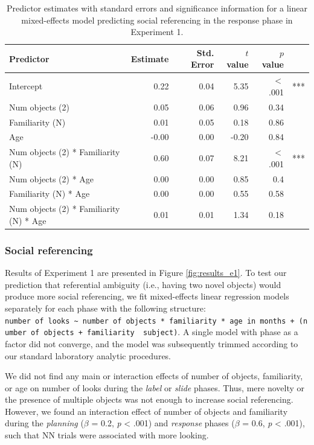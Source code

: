\documentclass[a4paper,man,apacite,floatsintext]{apa6}
\begin{document}
\begin{table}[tb]
\centering
\begin{tabular}{lrrrrl}
 Predictor & Estimate & Std. Error & $t$ value & $p$ value &  \\ 
  \hline
Intercept & 0.22 & 0.04 & 5.35 & $<$ .001 & *** \\ 
  Num objects (2) & 0.05 & 0.06 & 0.96 & 0.34 &  \\ 
  Familiarity (N) & 0.01 & 0.05 & 0.18 & 0.86 &  \\ 
  Age & -0.00 & 0.00 & -0.20 & 0.84 &  \\ 
  Num objects (2) * Familiarity (N) & 0.60 & 0.07 & 8.21 & $<$ .001 & *** \\ 
  Num objects (2) * Age & 0.00 & 0.00 & 0.85 & 0.4 &  \\ 
  Familiarity (N) * Age & 0.00 & 0.00 & 0.55 & 0.58 &  \\ 
  Num objects (2) * Familiarity (N) * Age & 0.01 & 0.01 & 1.34 & 0.18 &  \\ 
   \hline
\end{tabular}
\caption{Predictor estimates with standard errors and significance information for a linear mixed-effects model predicting social referencing in the response phase in Experiment 1.} 
\label{tab:exp1_r_reg}
\end{table}

\subsubsection{Social referencing}\label{social-referencing}

Results of Experiment 1 are presented in Figure \ref{fig:results_e1}. To
test our prediction that referential ambiguity (i.e., having two novel
objects) would produce more social referencing, we fit mixed-effects
linear regression models separately for each phase with the following
structure:
\texttt{number\ of\ looks\ \textasciitilde{}\ number\ of\ objects\ *\ familiarity\ *\ age\ in\ months\ +\ (number\ of\ objects\ +\ familiarity\ \textbar{}\ subject)}.
A single model with phase as a factor did not converge, and the model
was subsequently trimmed according to our standard laboratory analytic
procedures.

We did not find any main or interaction effects of number of objects,
familiarity, or age on number of looks during the \emph{label} or
\emph{slide} phases. Thus, mere novelty or the presence of multiple
objects was not enough to increase social referencing. However, we found
an interaction effect of number of objects and familiarity during the
\emph{planning} (\(\beta\) = 0.2, \emph{p} \textless{} .001) and
\emph{response} phases (\(\beta\) = 0.6, \emph{p} \textless{} .001),
such that NN trials were associated with more looking.
\end{document}
